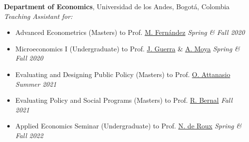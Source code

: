 \documentclass[margin,line]{res}
\begin{document}
\begin{resume}
{\bf Department of Economics}, Universidad de los Andes, Bogotá, Colombia \\
{\em Teaching Assistant for:} \\
\vspace{-.3cm}
\begin{itemize}
    \item Advanced Econometrics (Masters) to Prof. \href{https://sites.google.com/view/manuelfernandezsierra}{M. Fernández} \hfill \emph{Spring  \& Fall 2020}
    \item Microeconomics I (Undergraduate) to Prof. \href{https://jguerraforero.wixsite.com/joseaguerra}{J. Guerra} \& \href{https://sites.google.com/view/andresmoya}{A. Moya} \hfill \emph{Spring \& Fall 2020}
    \item Evaluating and Designing Public Policy (Masters) to Prof. \href{http://www.orazioattanasio.org/}{O. Attanasio}  \hfill \emph{Summer 2021}
    \item Evaluating Policy and Social Programs (Masters) to Prof. \href{https://sites.google.com/view/raquelbernal}{R. Bernal}  \hfill \emph{Fall 2021}
    \item Applied Economics Seminar (Undergraduate) to Prof. \href{https://sites.google.com/site/nicoderoux/}{N. de Roux}  \hfill \emph{Spring \& Fall 2022}
\end{itemize}







\end{resume}
\end{document}
